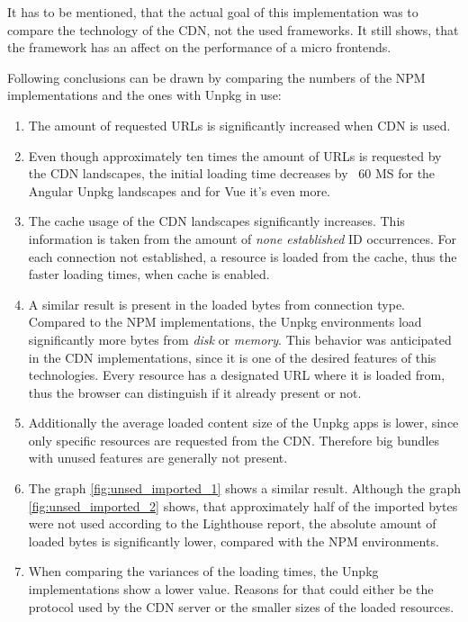 It has to be mentioned, that the actual goal of this implementation was to compare the technology of the CDN, not the used frameworks. It still shows, that the framework has an affect on the performance of a micro frontends. 

Following conclusions can be drawn by comparing the numbers of the NPM implementations and the ones with Unpkg in use:

\begin{enumerate}
	\item The amount of requested URLs is significantly increased when CDN is used.
	\item Even though approximately ten times the amount of URLs is requested by the CDN landscapes, the initial loading time decreases by ~60 MS for the Angular Unpkg landscapes and for Vue it's even more.
	\item The cache usage of the CDN landscapes significantly increases. This information is taken from the amount of \textit{none established} ID occurrences. For each connection not established, a resource is loaded from the cache, thus the faster loading times, when cache is enabled.
	\item A similar result is present in the loaded bytes from connection type. Compared to the NPM implementations, the Unpkg environments load significantly more bytes from \textit{disk} or \textit{memory}. This behavior was anticipated in the CDN implementations, since it is one of the desired features of this technologies. Every resource has a designated URL where it is loaded from, thus the browser can distinguish if it already present or not.
	\item Additionally the average loaded content size of the Unpkg apps is lower, since only specific resources are requested from the CDN. Therefore big bundles with unused features are generally not present.
	\item The graph \ref{fig:unsed_imported_1} shows a similar result. Although the graph \ref{fig:unsed_imported_2} shows, that approximately half of the imported bytes were not used according to the Lighthouse report, the absolute amount of loaded bytes is significantly lower, compared with the NPM environments.
	\item When comparing the variances of the loading times, the Unpkg implementations show a lower value. Reasons for that could either be the protocol used by the CDN server or the smaller sizes of the loaded resources.
\end{enumerate}

